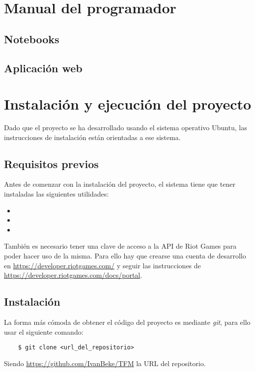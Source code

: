 \section{Manual del programador}
\subsection{Notebooks}
\subsection{Aplicación web}

\section{Instalación y ejecución del proyecto}
Dado que el proyecto se ha desarrollado usando el sistema operativo Ubuntu, las instrucciones de instalación están orientadas a ese sistema.

\subsection{Requisitos previos}
Antes de comenzar con la instalación del proyecto, el sistema tiene que tener instaladas las siguientes utilidades:
\begin{itemize}
	\item {}
	\item {}
	\item {}
\end{itemize}

También es necesario tener una clave de acceso a la API de Riot Games para poder hacer uso de la misma. Para ello hay que crearse una cuenta de desarrollo en \url{https://developer.riotgames.com/} y seguir las instrucciones de \url{https://developer.riotgames.com/docs/portal}.

\subsection{Instalación}\label{sec:instalacion}
La forma más cómoda de obtener el código del proyecto es mediante \textit{git}, para ello usar el siguiente comando:
\begin{lstlisting}
	$ git clone <url_del_repositorio>
\end{lstlisting}
Siendo \url{https://github.com/IvanBeke/TFM} la URL del repositorio.

